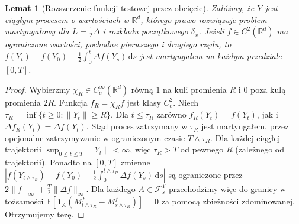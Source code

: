 \documentclass[11pt,a4paper,oneside]{report}
\numberwithin{equation}{chapter}
\theoremstyle{plain}
\newtheorem{lemat}[twierdzenie]{Lemat}
\theoremstyle{definition}
\theoremstyle{remark}
\newcommand{\R}{\mathbb{R}}
\newcommand{\E}{\mathbb{E}}
\newcommand{\calF}{\mathcal{F}}
\newcommand{\ind}[1]{\mathbf{1}_{#1}}
\newcommand{\dd}{\mathrm{d}}
\newcommand{\norm}[1]{\lVert #1\rVert}
\begin{document}
\begin{lemat}[Rozszerzenie funkcji testowej przez obcięcie]\label{lem:volIII:07:01}
\label{lem:mp-cutoff}
Załóżmy, że $Y$ jest ciągłym procesem o wartościach w $\R^d$,
którego prawo rozwiązuje problem martyngałowy dla
$L=\frac12\Delta$ i rozkładu początkowego $\delta_x$.
Jeżeli $f\in C^2(\R^d)$ ma ograniczone wartości,
pochodne pierwszego i drugiego rzędu, to
$f(Y_t)-f(Y_0)-\frac12\int_0^t\Delta f(Y_s)\,\dd s$
jest martyngałem na każdym przedziale $[0,T]$.
\end{lemat}
\begin{proof}
Wybierzmy $\chi_R\in C_c^\infty(\R^d)$ równą $1$ na
kuli promienia $R$ i $0$ poza kulą promienia $2R$.
Funkcja $f_R=\chi_R f$ jest klasy $C_c^2$.
Niech $\tau_R=\inf\{t\ge0:\norm{Y_t}\ge R\}$.
Dla $t\le\tau_R$ zarówno $f_R(Y_t)=f(Y_t)$,
jak i $\Delta f_R(Y_t)=\Delta f(Y_t)$.
Stąd proces zatrzymany w $\tau_R$ jest martyngałem,
przez opcjonalne zatrzymywanie w ograniczonym czasie
$T\wedge\tau_R$. Dla każdej ciągłej trajektorii
$\sup_{0\le t\le T}\norm{Y_t}<\infty$, więc
$\tau_R>T$ od pewnego $R$ (zależnego od trajektorii).
Ponadto na $[0,T]$ zmienne
$|f(Y_{t\wedge\tau_R})-f(Y_0)
-\frac12\int_0^{t\wedge\tau_R}\Delta f(Y_s)\,\dd s|$
są ograniczone przez
$2\norm f_\infty+\frac T2\norm{\Delta f}_\infty$.
Dla każdego $A\in\calF_s^Y$ przechodzimy więc
do granicy w tożsamości
$\E[\ind A(M_{t\wedge\tau_R}^f-M_{s\wedge\tau_R}^f)]=0$
za pomocą zbieżności zdominowanej. Otrzymujemy tezę.
\end{proof}
\end{document}
